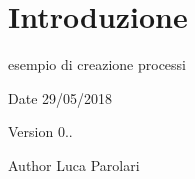 \hypertarget{index_intro}{}\section{Introduzione}\label{index_intro}
esempio di creazione processi~\newline
 \begin{DoxyDate}{Date}
29/05/2018 
\end{DoxyDate}
\begin{DoxyVersion}{Version}
0.. 
\end{DoxyVersion}
\begin{DoxyAuthor}{Author}
Luca Parolari 
\end{DoxyAuthor}
